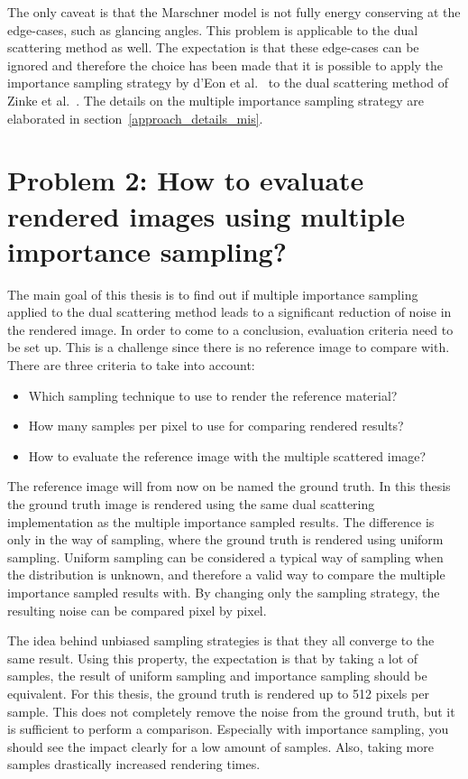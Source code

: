 \documentclass[11pt,a4paper]{report}
\begin{document}
The only caveat is that the Marschner model is not fully energy conserving at the edge-cases, such as glancing angles. This problem is applicable to the dual scattering method as well. The expectation is that these edge-cases can be ignored and therefore the choice has been made that it is possible to apply the importance sampling strategy by d'Eon et al.~\cite{eon2013} to the dual scattering method of Zinke et al.~\cite{zinke}. The details on the multiple importance sampling strategy are elaborated in section~\ref{approach_details_mis}.





\section{Problem 2: How to evaluate rendered images using multiple importance sampling?}

The main goal of this thesis is to find out if multiple importance sampling applied to the dual scattering method leads to a significant reduction of noise in the rendered image. In order to come to a conclusion, evaluation criteria need to be set up. This is a challenge since there is no reference image to compare with. There are three criteria to take into account:

\begin{itemize}
    \item Which sampling technique to use to render the reference material?
    \item How many samples per pixel to use for comparing rendered results?
    \item How to evaluate the reference image with the multiple scattered image?
\end{itemize}

The reference image will from now on be named the ground truth. In this thesis the ground truth image is rendered using the same dual scattering implementation as the multiple importance sampled results. The difference is only in the way of sampling, where the ground truth is rendered using uniform sampling. Uniform sampling can be considered a typical way of sampling when the distribution is unknown, and therefore a valid way to compare the multiple importance sampled results with. By changing only the sampling strategy, the resulting noise can be compared pixel by pixel. 

The idea behind unbiased sampling strategies is that they all converge to the same result. Using this property, the expectation is that by taking a lot of samples, the result of uniform sampling and importance sampling should be equivalent. For this thesis, the ground truth is rendered up to 512 pixels per sample. This does not completely remove the noise from the ground truth, but it is sufficient to perform a comparison. Especially with importance sampling, you should see the impact clearly for a low amount of samples. Also, taking more samples drastically increased rendering times. 
\end{document}
